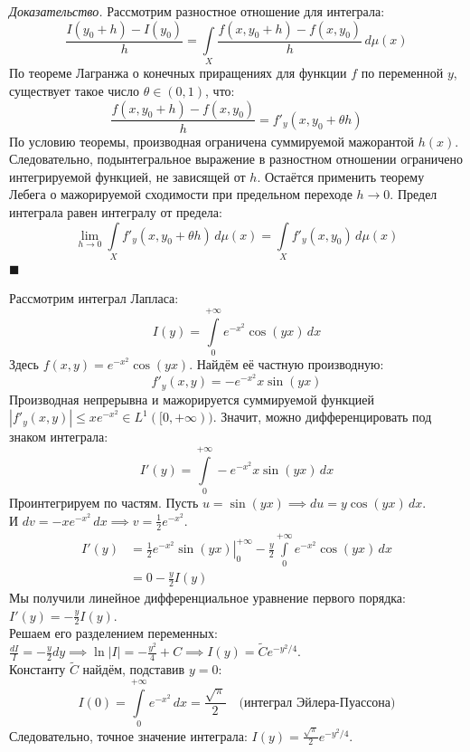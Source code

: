 \documentclass[12pt,a4paper]{article}
\newenvironment{Proof}[1][Доказательство]{\vspace{0.5em}\noindent\textit{#1.}\hspace{0.5em}\ignorespaces}{\hfill$\blacksquare$\vspace{1em}}
\begin{document}
\begin{Proof}
Рассмотрим разностное отношение для интеграла:
$$ \frac{I(y_0 + h) - I(y_0)}{h} = \int\limits_X \frac{f(x, y_0 + h) - f(x, y_0)}{h} \, d\mu(x) $$
По теореме Лагранжа о конечных приращениях для функции $f$ по переменной $y$, существует такое число $\theta \in (0, 1)$, что:
$$ \frac{f(x, y_0 + h) - f(x, y_0)}{h} = f'_y(x, y_0 + \theta h) $$
По условию теоремы, производная ограничена суммируемой мажорантой $h(x)$. Следовательно, подынтегральное выражение в разностном отношении ограничено интегрируемой функцией, не зависящей от $h$. 
Остаётся применить теорему Лебега о мажорируемой сходимости при предельном переходе $h \to 0$. Предел интеграла равен интегралу от предела:
$$ \lim\limits_{h \to 0} \int\limits_X f'_y(x, y_0 + \theta h) \, d\mu(x) = \int\limits_X f'_y(x, y_0) \, d\mu(x) $$
\end{Proof}

\begin{Example}
Рассмотрим интеграл Лапласа:
$$ I(y) = \int\limits_0^{+\infty} e^{-x^2} \cos(yx) \, dx $$
Здесь $f(x,y) = e^{-x^2} \cos(yx)$. Найдём её частную производную:
$$ f'_y(x,y) = -e^{-x^2} x \sin(yx) $$
Производная непрерывна и мажорируется суммируемой функцией $|f'_y(x,y)| \le x e^{-x^2} \in L^1([0, +\infty))$. Значит, можно дифференцировать под знаком интеграла:
$$ I'(y) = \int\limits_0^{+\infty} -e^{-x^2} x \sin(yx) \, dx $$
Проинтегрируем по частям. Пусть $u = \sin(yx) \implies du = y \cos(yx) \, dx$. \\
И $dv = -x e^{-x^2} \, dx \implies v = \frac{1}{2} e^{-x^2}$.
\begin{align*}
    I'(y) &= \left. \frac{1}{2} e^{-x^2} \sin(yx) \right|_0^{+\infty} - \frac{y}{2} \int\limits_0^{+\infty} e^{-x^2} \cos(yx) \, dx \\
    &= 0 - \frac{y}{2} I(y)
\end{align*}
Мы получили линейное дифференциальное уравнение первого порядка: $I'(y) = -\frac{y}{2} I(y)$. \\
Решаем его разделением переменных: $\frac{dI}{I} = -\frac{y}{2} dy \implies \ln|I| = -\frac{y^2}{4} + C \implies I(y) = \tilde{C} e^{-y^2/4}$. \\
Константу $\tilde{C}$ найдём, подставив $y = 0$:
$$ I(0) = \int\limits_0^{+\infty} e^{-x^2} \, dx = \frac{\sqrt{\pi}}{2} \quad \text{(интеграл Эйлера-Пуассона)} $$
Следовательно, точное значение интеграла: $I(y) = \frac{\sqrt{\pi}}{2} e^{-y^2/4}$.
\end{Example}
\end{document}
